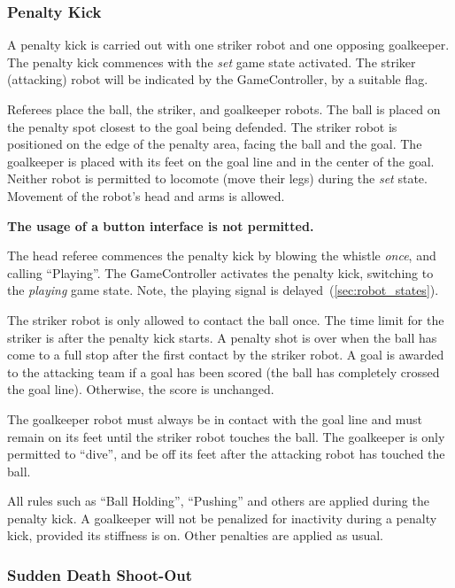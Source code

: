 \subsubsection{Penalty Kick}
\label{sec:penalty_kick}

A penalty kick is carried out with one striker robot and one opposing goalkeeper.
The penalty kick commences with the \textit{set} game state activated.
The striker (attacking) robot will be indicated by the GameController, by a suitable flag.

Referees place the ball, the striker, and goalkeeper robots. The ball is placed on the penalty spot closest to the goal being defended. The striker robot is positioned on the edge of the penalty area, facing the ball and the goal. The goalkeeper is placed with its feet on the goal line and in the center of the goal. Neither robot is permitted to locomote (move their legs) during the \textit{set} state. Movement of the robot's head and arms is allowed.

\textbf{The usage of a button interface is not permitted.}

The head referee commences the penalty kick by blowing the whistle \textit{once}, and calling ``Playing''.
The GameController activates the penalty kick, switching to the \emph{playing} game state.
Note, the playing signal is delayed~(\cf \cref{sec:robot_states}).

The striker robot is only allowed to contact the ball once.
The time limit for the striker is \PenaltyKickTime after the penalty kick starts.
A penalty shot is over when the ball has come to a full stop after the first contact by the striker robot.
A goal is awarded to the attacking team if a goal has been scored (\ie the ball has completely crossed the goal line).
Otherwise, the score is unchanged.

The goalkeeper robot must always be in contact with the goal line and must remain on its feet until the striker robot touches the ball.
The goalkeeper is only permitted to ``dive'', and be off its feet after the attacking robot has touched the ball.

All rules such as ``Ball Holding'', ``Pushing'' and others are applied during the penalty kick.
A goalkeeper will not be penalized for inactivity during a penalty kick, provided its stiffness is on.
Other penalties are applied as usual.

\subsubsection{Sudden Death Shoot-Out}
\label{sec:sudden_death_shoot_out}

